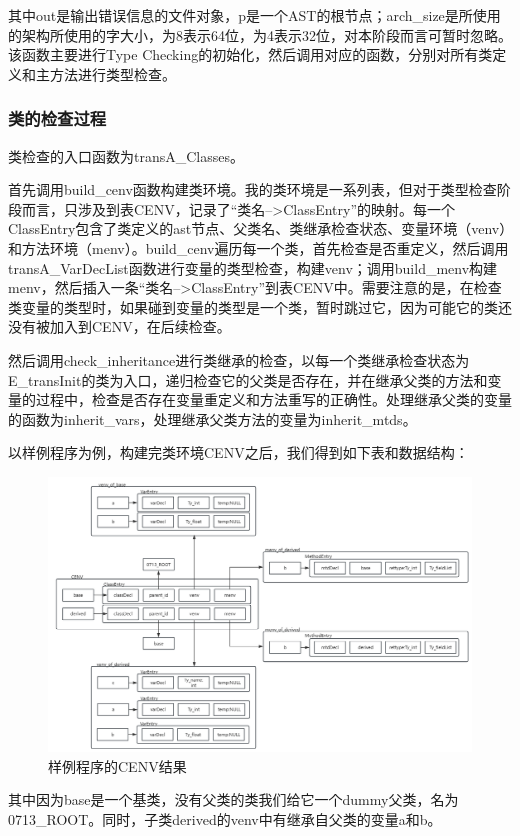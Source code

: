 \documentclass{article}
\begin{document}
其中out是输出错误信息的文件对象，p是一个AST的根节点；arch\_size是所使用的架构所使用的字大小，为8表示64位，为4表示32位，对本阶段而言可暂时忽略。该函数主要进行Type Checking的初始化，然后调用对应的函数，分别对所有类定义和主方法进行类型检查。

\subsubsection{类的检查过程}
类检查的入口函数为transA\_Classes。

首先调用build\_cenv函数构建类环境。我的类环境是一系列表，但对于类型检查阶段而言，只涉及到表CENV，记录了“类名-->ClassEntry”的映射。每一个ClassEntry包含了类定义的ast节点、父类名、类继承检查状态、变量环境（venv）和方法环境（menv）。build\_cenv遍历每一个类，首先检查是否重定义，然后调用transA\_VarDecList函数进行变量的类型检查，构建venv；调用build\_menv构建menv，然后插入一条“类名-->ClassEntry”到表CENV中。需要注意的是，在检查类变量的类型时，如果碰到变量的类型是一个类，暂时跳过它，因为可能它的类还没有被加入到CENV，在后续检查。

然后调用check\_inheritance进行类继承的检查，以每一个类继承检查状态为E\_transInit的类为入口，递归检查它的父类是否存在，并在继承父类的方法和变量的过程中，检查是否存在变量重定义和方法重写的正确性。处理继承父类的变量的函数为inherit\_vars，处理继承父类方法的变量为inherit\_mtds。

以样例程序为例，构建完类环境CENV之后，我们得到如下表和数据结构：
\begin{figure}[h]
  \centering
  \includegraphics[width=.9\linewidth]{pics/cenv.jpg}
  \caption{样例程序的CENV结果}
  \label{fig:cenv}
\end{figure}
其中因为base是一个基类，没有父类的类我们给它一个dummy父类，名为0713\_ROOT。同时，子类derived的venv中有继承自父类的变量a和b。
\end{document}
